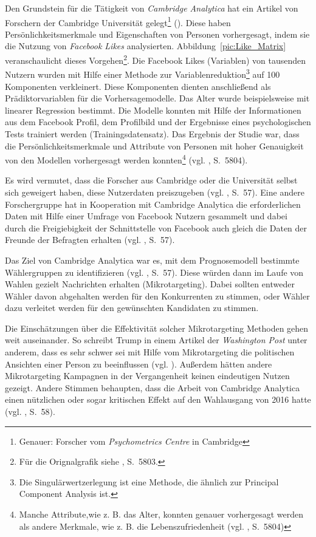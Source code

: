 Den Grundstein für die Tätigkeit von \emph{Cambridge Analytica} hat ein Artikel
von Forschern der Cambridge Universität gelegt\footnote{
Genauer: Forscher vom \emph{Psychometrics Centre} in Cambridge
} (\cite{Kosinski}). Diese haben Persönlichkeitsmerkmale und Eigenschaften von
Personen vorhergesagt, indem sie die Nutzung von \emph{Facebook Likes} analysierten.
Abbildung~\ref{pic:Like_Matrix} veranschaulicht dieses Vorgehen\footnote{
Für die Orignalgrafik siehe \cite{Kosinski}, S.~5803.
}. Die Facebook Likes (Variablen) von tausenden Nutzern wurden mit Hilfe einer Methode zur
Variablenreduktion\footnote{
Die Singulärwertzerlegung ist eine Methode, die ähnlich zur Principal Component Analysis ist.
} auf 100 Komponenten verkleinert. Diese Komponenten dienten anschließend als Prädiktorvariablen
für die Vorhersagemodelle. Das Alter wurde beispielsweise mit linearer Regression bestimmt.
Die Modelle konnten mit Hilfe der Informationen aus dem Facebook Profil, dem
Profilbild und der Ergebnisse eines psychologischen Tests trainiert werden (Trainingsdatensatz).
Das Ergebnis der Studie war, dass die Persönlichkeitsmerkmale und Attribute von Personen mit hoher
Genauigkeit von den Modellen vorhergesagt werden konnten\footnote{
Manche Attribute,wie z. B. das Alter, konnten genauer vorhergesagt werden als andere Merkmale, wie z. B. die Lebenszufriedenheit (vgl. \cite{Kosinski}, S.~5804)
} (vgl. \cite{Kosinski}, S.~5804).

Es wird vermutet, dass die Forscher aus Cambridge oder die Universität selbst sich geweigert haben, diese Nutzerdaten
preiszugeben (vgl. \cite{Isaak}, S.~57). Eine andere Forschergruppe hat in Kooperation mit Cambridge Analytica die
erforderlichen Daten mit Hilfe einer Umfrage von Facebook Nutzern gesammelt und dabei durch die Freigiebigkeit der Schnittstelle von
Facebook auch gleich die Daten der Freunde der Befragten erhalten (vgl. \cite{Isaak}, S.~57).

Das Ziel von Cambridge Analytica war es, mit dem Prognosemodell bestimmte Wählergruppen zu identifizieren (vgl. \cite{Isaak}, S.~57).
Diese würden dann im Laufe von Wahlen gezielt Nachrichten erhalten (Mikrotargeting). Dabei sollten entweder Wähler davon abgehalten
werden für den Konkurrenten zu stimmen, oder Wähler dazu verleitet werden für den gewünschten Kandidaten zu stimmen.

Die Einschätzungen über die Effektivität solcher Mikrotargeting Methoden gehen weit auseinander. So schreibt Trump in einem
Artikel der \emph{Washington Post} unter anderem, dass es sehr schwer sei mit Hilfe vom Mikrotargeting die politischen Ansichten
einer Person zu beeinflussen (vgl. \cite{Trump}). Außerdem hätten andere Mikrotargeting Kampagnen in der Vergangenheit keinen
eindeutigen Nutzen gezeigt. Andere Stimmen behaupten, dass die Arbeit von Cambridge Analytica einen nützlichen oder sogar
kritischen Effekt auf den Wahlausgang von 2016 hatte (vgl. \cite{Isaak}, S.~58).

